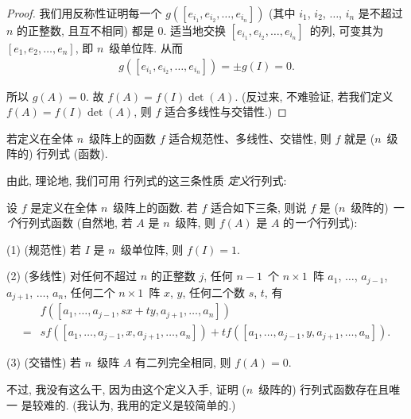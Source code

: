 \begin{proof}
    我们用反称性证明每一个
    \(g([e_{i_1}, e_{i_2}, \dots, e_{i_n}])\)
    (其中 \(i_1\), \(i_2\), \(\dots\), \(i_n\)
    是不超过 \(n\) 的正整数, 且互不相同)
    都是 \(0\).
    适当地交换
    \([e_{i_1}, e_{i_2}, \dots, e_{i_n}]\)~的列,
    可变其为 \([e_1, e_2, \dots, e_n]\),
    即 \(n\)~级单位阵.
    从而
    \begin{align*}
        g([e_{i_1}, e_{i_2}, \dots, e_{i_n}])
        = \pm g(I) = 0.
    \end{align*}

    所以 \(g(A) = 0\).
    故 \(f(A) = f(I) \det {(A)}\).
    (反过来, 不难验证, 若我们定义
    \(f(A) = f(I) \det {(A)}\),
    则 \(f\) 适合多线性与交错性.)
\end{proof}

\begin{theorem}
    若定义在全体 \(n\)~级阵上的函数 \(f\)
    适合规范性、多线性、交错性,
    则 \(f\) 就是 (\(n\)~级阵的) 行列式 (函数).
\end{theorem}

由此, 理论地, 我们可用%
行列式的这三条性质%
\emph{定义}行列式:

\begin{definition}
    设 \(f\) 是定义在全体 \(n\)~级阵上的函数.
    若 \(f\) 适合如下三条, 则说
    \(f\) 是 (\(n\)~级阵的) \emph{一个}行列式函数
    (自然地, 若 \(A\) 是 \(n\)~级阵,
    则 \(f(A)\) 是 \(A\) 的\emph{一个}行列式):

    (1)
    (规范性)
    若 \(I\) 是 \(n\)~级单位阵,
    则 \(f(I) = 1\).

    (2)
    (多线性)
    对任何不超过 \(n\) 的正整数 \(j\),
    任何 \(n-1\)~个 \(n \times 1\)~阵
    \(a_1\), \(\dots\), \(a_{j-1}\),
    \(a_{j+1}\), \(\dots\), \(a_n\),
    任何二个 \(n \times 1\)~阵 \(x\), \(y\),
    任何二个数 \(s\), \(t\),
    有
    \begin{align*}
             & f
            {([a_1, \dots, a_{j-1}, sx + ty,
                        a_{j+1}, \dots, a_n])}
        \\
        = {} &
        s
        f {([a_1, \dots, a_{j-1}, x, a_{j+1}, \dots, a_n])}
        +
        t
        f {([a_1, \dots, a_{j-1}, y, a_{j+1}, \dots, a_n])}.
    \end{align*}

    (3)
    (交错性)
    若 \(n\)~级阵 \(A\) 有二列完全相同,
    则 \(f {(A)} = 0\).
\end{definition}

不过, 我没有这么干,
因为由这个定义入手,
证明 (\(n\)~级阵的) 行列式函数存在且唯一%
是较难的.
(我认为, 我用的定义是较简单的.)

